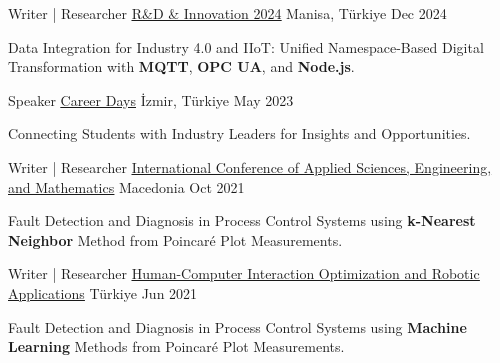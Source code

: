 

\begin{cventries}

  \cventry
    {Writer | Researcher} %
{\underline{\href{https://drive.google.com/file/d/1ivfaVjw6XqgFRJAQo3pBvQmMTUhmbsgr/view?usp=sharing}{R\&D \& Innovation 2024}}} %
    {Manisa, Türkiye} %
    {Dec 2024} %
    {
      \begin{cvitems} %
        \item {Data Integration for Industry 4.0 and IIoT: Unified Namespace-Based Digital Transformation with \textbf{MQTT}, \textbf{OPC UA}, and \textbf{Node.js}.}
      \end{cvitems}
    }

  \cventry
    {Speaker} %
{\underline{\href{https://drive.google.com/file/d/1ZALfm7lulleyhJFwW07I3UpTTDJ8onWq/view?usp=sharing}{Career Days}}} %
    {İzmir, Türkiye} %
    {May 2023} %
    {
      \begin{cvitems} %
        \item {Connecting Students with Industry Leaders for Insights and Opportunities.}
      \end{cvitems}
    }

  \cventry
    {Writer | Researcher} %
{\underline{\href{https://drive.google.com/file/d/1ZPOH-EiYq5hWN7-3n2Lljo759LFpQRs1/view?usp=sharing}{International Conference of Applied Sciences, Engineering, and Mathematics}}} %
    {Macedonia} %
    {Oct 2021} %
    {
      \begin{cvitems} %
        \item {Fault Detection and Diagnosis in Process Control Systems using \textbf{k-Nearest Neighbor} Method from Poincaré Plot Measurements.}
      \end{cvitems}
    }

  \cventry
    {Writer | Researcher} %
{\underline{\href{https://drive.google.com/file/d/1Z7KmRMDIiHNtQE6XNgA1lG3MkYo-7Zpp/view?usp=sharing}{Human-Computer Interaction Optimization and Robotic Applications}}} %
    {Türkiye} %
    {Jun 2021} %
    {
      \begin{cvitems} %
        \item {Fault Detection and Diagnosis in Process Control Systems using \textbf{Machine Learning} Methods from Poincaré Plot Measurements.}
      \end{cvitems}
    }


\end{cventries}
